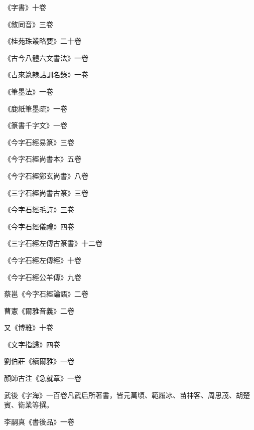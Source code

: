 \begin{pinyinscope}
 《字書》十卷



 《敘同音》三卷



 《桂苑珠叢略要》二十卷



 《古今八體六文書法》一卷



 《古來篆隸詁訓名錄》一卷



 《筆墨法》一卷



 《鹿紙筆墨疏》一卷



 《篆書千字文》一卷



 《今字石經易篆》三卷



 《今字石經尚書本》五卷



 《今字石經鄭玄尚書》八卷



 《三字石經尚書古篆》三卷



 《今字石經毛詩》三卷



 《今字石經儀禮》四卷



 《三字石經左傳古篆書》十二卷



 《今字石經左傳經》十卷



 《今字石經公羊傳》九卷



 蔡邕《今字石經論語》二卷



 曹憲《爾雅音義》二卷



 又《博雅》十卷



 《文字指歸》四卷



 劉伯莊《續爾雅》一卷



 顏師古注《急就章》一卷



 武後《字海》一百卷凡武后所著書，皆元萬頃、範履冰、苗神客、周思茂、胡楚賓、衛業等撰。



 李嗣真《書後品》一卷




\end{pinyinscope}
